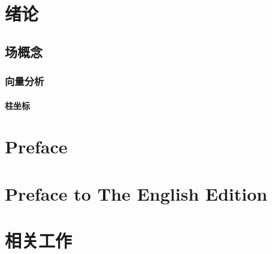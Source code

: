 \documentclass[11pt,a4paper,openany]{ctexbook}
\begin{document}
\chapter{绪论}
\section{场概念}
\subsection{向量分析}
\subsubsection{柱坐标}
\chapter{Preface}
\chapter{Preface to The English Edition}
\chapter{相关工作}
\end{document}
